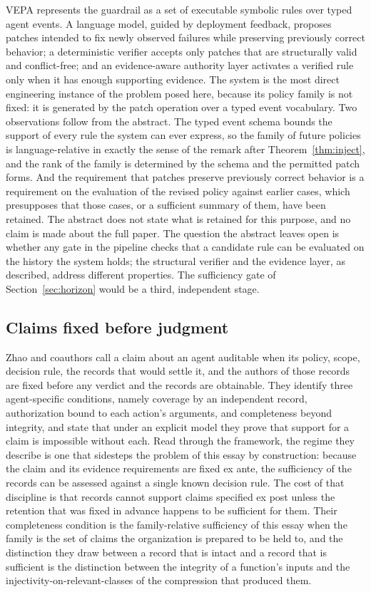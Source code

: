 \documentclass[11pt]{article}
\theoremstyle{definition}
\theoremstyle{remark}
\begin{document}
VEPA \cite{vepa} represents the guardrail as a set of executable symbolic rules over typed agent events. A language model, guided by deployment feedback, proposes patches intended to fix newly observed failures while preserving previously correct behavior; a deterministic verifier accepts only patches that are structurally valid and conflict-free; and an evidence-aware authority layer activates a verified rule only when it has enough supporting evidence. The system is the most direct engineering instance of the problem posed here, because its policy family is not fixed: it is generated by the patch operation over a typed event vocabulary. Two observations follow from the abstract. The typed event schema bounds the support of every rule the system can ever express, so the family of future policies is language-relative in exactly the sense of the remark after Theorem~\ref{thm:inject}, and the rank of the family is determined by the schema and the permitted patch forms. And the requirement that patches preserve previously correct behavior is a requirement on the evaluation of the revised policy against earlier cases, which presupposes that those cases, or a sufficient summary of them, have been retained. The abstract does not state what is retained for this purpose, and no claim is made about the full paper. The question the abstract leaves open is whether any gate in the pipeline checks that a candidate rule can be evaluated on the history the system holds; the structural verifier and the evidence layer, as described, address different properties. The sufficiency gate of Section~\ref{sec:horizon} would be a third, independent stage.

\subsection{Claims fixed before judgment}

Zhao and coauthors \cite{auditable} call a claim about an agent auditable when its policy, scope, decision rule, the records that would settle it, and the authors of those records are fixed before any verdict and the records are obtainable. They identify three agent-specific conditions, namely coverage by an independent record, authorization bound to each action's arguments, and completeness beyond integrity, and state that under an explicit model they prove that support for a claim is impossible without each. Read through the framework, the regime they describe is one that sidesteps the problem of this essay by construction: because the claim and its evidence requirements are fixed ex ante, the sufficiency of the records can be assessed against a single known decision rule. The cost of that discipline is that records cannot support claims specified ex post unless the retention that was fixed in advance happens to be sufficient for them. Their completeness condition is the family-relative sufficiency of this essay when the family is the set of claims the organization is prepared to be held to, and the distinction they draw between a record that is intact and a record that is sufficient is the distinction between the integrity of a function's inputs and the injectivity-on-relevant-classes of the compression that produced them.
\end{document}
